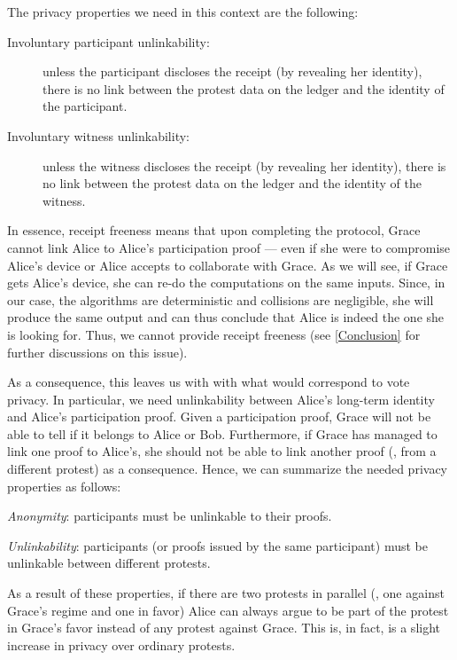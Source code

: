 The privacy properties we need in this context are the following:
\begin{description}
  \item[Involuntary participant unlinkability:]  unless the participant discloses the receipt 
    (by revealing her identity), there is no link between the protest data on 
    the ledger and the identity of the participant.

  \item[Involuntary witness unlinkability:]  unless the witness discloses the receipt (by revealing her 
    identity), there is no link between the protest data on the ledger and the 
    identity of the witness.
\end{description}
In essence, receipt freeness means that upon completing the protocol, Grace cannot link Alice to Alice's participation proof --- even if she were to compromise Alice's device or Alice accepts to collaborate with Grace.
As we will see, if Grace gets Alice's device, she can re-do the computations on the same inputs.
Since, in our case, the algorithms are deterministic and collisions are negligible, she will produce the same output and can thus conclude that Alice is indeed the one she is looking for.
Thus, we cannot provide receipt freeness (see \cref{Conclusion} for further discussions on this issue).

As a consequence, this leaves us with with what would correspond to vote privacy.
In particular, we need unlinkability between Alice's long-term identity and Alice's participation proof.
Given a participation proof, Grace will not be able to tell if it belongs to Alice or Bob.
Furthermore, if Grace has managed to link one proof to Alice's, she should not be able to link another proof (\eg, from a different protest) as a consequence.
Hence, we can summarize the needed privacy properties as follows:
\begin{requirements}[P]
\item\label{ProofUnlink} \emph{Anonymity}: participants must be unlinkable to their proofs.
\item\label{ProtestUnlink} \emph{Unlinkability}: participants (or proofs issued by the same participant) must be unlinkable between different protests.
\end{requirements}

As a result of these properties, if there are two protests in parallel (\eg, one against Grace's regime and one in favor) Alice can always argue to be part of the protest in Grace's favor instead of any protest against Grace.
This is, in fact, is a slight increase in privacy over ordinary protests.

